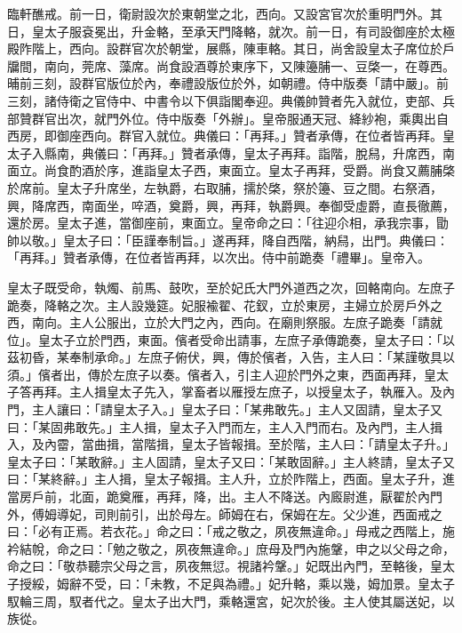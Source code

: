 \begin{pinyinscope}
 臨軒醮戒。前一日，衛尉設次於東朝堂之北，西向。又設宮官次於重明門外。其日，皇太子服袞冕出，升金輅，至承天門降輅，就次。前一日，有司設御座於太極殿阼階上，西向。設群官次於朝堂，展縣，陳車輅。其日，尚舍設皇太子席位於戶牖間，南向，莞席、藻席。尚食設酒尊於東序下，又陳籩脯一、豆棨一，在尊西。晡前三刻，設群官版位於內，奉禮設版位於外，如朝禮。侍中版奏「請中嚴」。前三刻，諸侍衛之官侍中、中書令以下俱詣閣奉迎。典儀帥贊者先入就位，吏部、兵部贊群官出次，就門外位。侍中版奏「外辦」。皇帝服通天冠、絳紗袍，乘輿出自西房，即御座西向。群官入就位。典儀曰：「再拜。」贊者承傳，在位者皆再拜。皇太子入縣南，典儀曰：「再拜。」贊者承傳，皇太子再拜。詣階，脫舄，升席西，南面立。尚食酌酒於序，進詣皇太子西，東面立。皇太子再拜，受爵。尚食又薦脯棨於席前。皇太子升席坐，左執爵，右取脯，擩於棨，祭於籩、豆之間。右祭酒，興，降席西，南面坐，啐酒，奠爵，興，再拜，執爵興。奉御受虛爵，直長徹薦，還於房。皇太子進，當御座前，東面立。皇帝命之曰：「往迎尒相，承我宗事，勖帥以敬。」皇太子曰：「臣謹奉制旨。」遂再拜，降自西階，納舄，出門。典儀曰：「再拜。」贊者承傳，在位者皆再拜，以次出。侍中前跪奏「禮畢」。皇帝入。



 皇太子既受命，執燭、前馬、鼓吹，至於妃氏大門外道西之次，回輅南向。左庶子跪奏，降輅之次。主人設幾筵。妃服褕翟、花釵，立於東房，主婦立於房戶外之西，南向。主人公服出，立於大門之內，西向。在廟則祭服。左庶子跪奏「請就位」。皇太子立於門西，東面。儐者受命出請事，左庶子承傳跪奏，皇太子曰：「以茲初昏，某奉制承命。」左庶子俯伏，興，傳於儐者，入告，主人曰：「某謹敬具以須。」儐者出，傳於左庶子以奏。儐者入，引主人迎於門外之東，西面再拜，皇太子答再拜。主人揖皇太子先入，掌畜者以雁授左庶子，以授皇太子，執雁入。及內門，主人讓曰：「請皇太子入。」皇太子曰：「某弗敢先。」主人又固請，皇太子又曰：「某固弗敢先。」主人揖，皇太子入門而左，主人入門而右。及內門，主人揖入，及內霤，當曲揖，當階揖，皇太子皆報揖。至於階，主人曰：「請皇太子升。」皇太子曰：「某敢辭。」主人固請，皇太子又曰：「某敢固辭。」主人終請，皇太子又曰：「某終辭。」主人揖，皇太子報揖。主人升，立於阼階上，西面。皇太子升，進當房戶前，北面，跪奠雁，再拜，降，出。主人不降送。內廄尉進，厭翟於內門外，傅姆導妃，司則前引，出於母左。師姆在右，保姆在左。父少進，西面戒之曰：「必有正焉。若衣花。」命之曰：「戒之敬之，夙夜無違命。」母戒之西階上，施衿結帨，命之曰：「勉之敬之，夙夜無違命。」庶母及門內施鞶，申之以父母之命，命之曰：「敬恭聽宗父母之言，夙夜無愆。視諸衿鞶。」妃既出內門，至輅後，皇太子授綏，姆辭不受，曰：「未教，不足與為禮。」妃升輅，乘以幾，姆加景。皇太子馭輪三周，馭者代之。皇太子出大門，乘輅還宮，妃次於後。主人使其屬送妃，以族從。




\end{pinyinscope}
